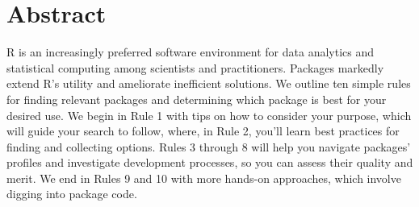 \documentclass[10pt,letterpaper]{article}
\newcommand{\getIndex}[2]{
  \ForEach{,}{\IfEq{#1}{\thislevelitem}{\number\thislevelcount\ExitForEach}{}}{#2}
}
\newcommand{\getAff}[1]{
  \getIndex{#1}{Stats,Math,ERHS}
}
\begin{document}
\vspace*{0.2in}

\section*{Abstract}
R is an increasingly preferred software environment for data analytics
and statistical computing among scientists and practitioners. Packages
markedly extend R's utility and ameliorate inefficient solutions. We
outline ten simple rules for finding relevant packages and determining
which package is best for your desired use. We begin in Rule 1 with tips
on how to consider your purpose, which will guide your search to follow,
where, in Rule 2, you'll learn best practices for finding and collecting
options. Rules 3 through 8 will help you navigate packages' profiles and
investigate development processes, so you can assess their quality and
merit. We end in Rules 9 and 10 with more hands-on approaches, which
involve digging into package code.

\end{document}

